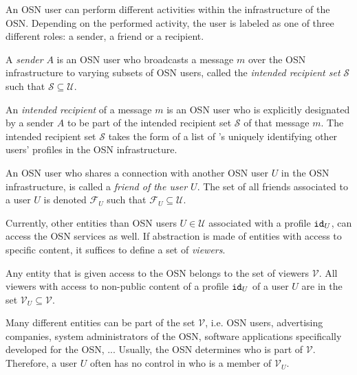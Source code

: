 An OSN user can perform different activities within the infrastructure of the OSN. Depending on the performed activity, the user is labeled as one of three different roles: a sender, a friend or a recipient.

\begin{defn}[Sender]
\label{def:sender}
 A \textit{sender} $A$ is an OSN user who broadcasts a message $m$ over the OSN infrastructure to varying subsets of OSN users, called the \textit{intended recipient set} $\mathcal{S}$ such that $\mathcal{S} \subseteq \mathcal{U}$.
\end{defn}

\begin{defn}
\label{def:recipient}
 An \textit{intended recipient} of a message $m$ is an OSN user who is explicitly designated by a sender $A$ to be part of the intended recipient set $\mathcal{S}$ of that message $m$. The intended recipient set $\mathcal{S}$ takes the form of a list of \id{}'s uniquely identifying other users' profiles in the OSN infrastructure.
\end{defn}

\begin{defn}[Friend]
\label{def:friend}
 An OSN user who shares a connection with another OSN user $U$ in the OSN infrastructure, is called a \textit{friend of the user $U$}. The set of all friends associated to a user $U$ is denoted $\mathcal{F}_U$ such that $\mathcal{F}_U \subseteq \mathcal{U}$.
\end{defn}

Currently, other entities than OSN users $U \in \mathcal{U}$ associated with a profile $\mathtt{id}_{U}$, can access the OSN services as well. If abstraction is made of entities with access to specific content, it suffices to define a set of \textit{viewers}.

\begin{defn}[Viewer]
\label{def:viewer}
 Any entity that is given access to the OSN belongs to the set of viewers $\mathcal{V}$. All viewers with access to non-public content of a profile $\mathtt{id}_{U}$ of a user $U$ are in the set $\mathcal{V}_U \subseteq \mathcal{V}$.
\end{defn}

Many different entities can be part of the set $\mathcal{V}$, i.e. OSN users, advertising companies, system administrators of the OSN, software applications specifically developed for the OSN, ... Usually, the OSN determines who is part of $\mathcal{V}$. Therefore, a user $U$ often has no control in who is a member of $\mathcal{V}_U$.

